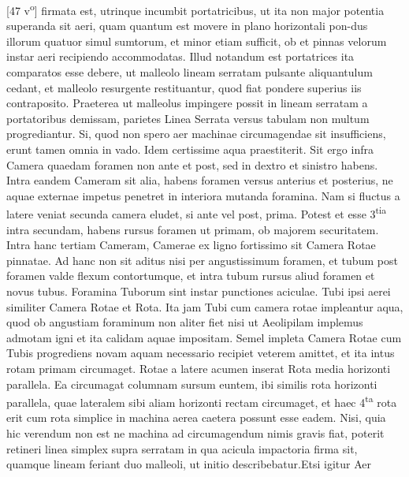 [47 v\textsuperscript{o}] firmata est, utrinque incumbit portatricibus, ut ita non major potentia superanda sit aeri, quam quantum est movere in plano horizontali pon-\pend\pstart\noindent dus illorum quatuor simul sumtorum, et minor etiam sufficit, ob  et pinnas velorum instar aeri recipiendo accommodatas. Illud notandum est portatrices ita comparatos esse debere, ut malleolo lineam serratam pulsante aliquantulum cedant, et malleolo resurgente restituantur, quod fiat pondere superius iis contraposito. Praeterea ut malleolus impingere possit in lineam serratam a portatoribus demissam, parietes  Linea Serrata versus tabulam non multum progrediantur. \pend \pstart Si, quod non spero aer machinae circumagendae sit insufficiens, erunt tamen omnia in vado. Idem certissime aqua praestiterit. Sit ergo infra Camera quaedam foramen non ante et post, sed in dextro et sinistro habens. Intra eandem Cameram sit alia, habens foramen versus anterius et posterius, ne  aquae externae impetus penetret in interiora mutanda foramina. Nam si fluctus a latere veniat secunda camera eludet, si ante vel post, prima. Potest et esse 3\textsuperscript{tia} intra secundam, habens rursus foramen ut primam, ob majorem securitatem. Intra hanc tertiam Cameram, Camerae ex ligno fortissimo sit Camera Rotae\protect{} pinnatae. Ad hanc non sit aditus nisi per angustissimum foramen, et tubum post foramen valde flexum contortumque, et intra tubum rursus aliud foramen et novus tubus. Foramina Tuborum sint instar punctiones aciculae. Tubi ipsi aerei similiter Camera Rotae\protect{} et Rota\protect{}.  Ita jam Tubi cum camera rotae\protect{} impleantur aqua, quod ob angustiam foraminum non aliter fiet nisi ut Aeolipilam\protect{} implemus admotam igni et ita calidam aquae impositam. Semel impleta Camera Rotae\protect{} cum Tubis progrediens novam aquam necessario recipiet veterem amittet, et ita intus rotam primam circumaget. Rotae\protect{} a latere acumen inserat Rota\protect{} media horizonti parallela. Ea circumagat columnam sursum euntem, ibi similis rota\protect{} horizonti parallela, quae lateralem sibi aliam horizonti rectam circumaget, et haec 4\textsuperscript{ta} rota \protect{} erit cum rota\protect{} simplice in machina aerea caetera possunt esse eadem. Nisi, quia hic verendum non est ne machina ad circumagendum nimis gravis fiat, poterit retineri linea simplex supra serratam in qua acicula impactoria firma sit, quamque lineam feriant duo malleoli, ut initio describebatur.\pend \pstart Etsi igitur Aer 
